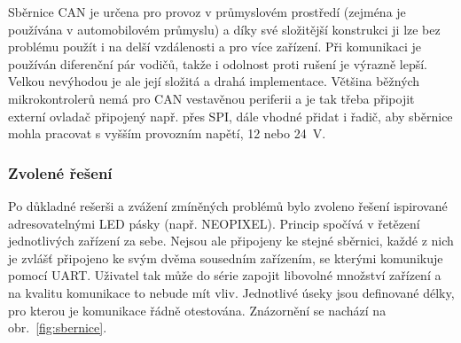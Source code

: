         Sběrnice CAN je určena pro provoz v průmyslovém prostředí (zejména je používána v automobilovém průmyslu) a díky své složitější konstrukci ji lze bez problému použít i na delší vzdálenosti a pro více zařízení. Při komunikaci je používán diferenční pár vodičů, takže i odolnost proti rušení je výrazně lepší. Velkou nevýhodou je ale její složitá a drahá implementace. Většina běžných mikrokontrolerů nemá pro CAN vestavěnou periferii a je tak třeba připojit externí ovladač připojený např. přes SPI, dále vhodné přidat i řadič, aby sběrnice mohla pracovat s vyšším provozním napětí, 12 nebo \qty{24}{V}. 

    \subsubsection{Zvolené řešení}
        Po důkladné rešerši a zvážení zmíněných problémů bylo zvoleno řešení ispirované adresovatelnými LED pásky (např. NEOPIXEL). Princip spočívá v řetězení jednotlivých zařízení za sebe. Nejsou ale připojeny ke stejné sběrnici, každé z nich je zvlášť připojeno ke svým dvěma sousedním zařízením, se kterými komunikuje pomocí UART. Uživatel tak může do série zapojit libovolné množství zařízení a na kvalitu komunikace to nebude mít vliv. Jednotlivé úseky jsou definované délky, pro kterou je komunikace řádně otestována. Znázornění se nachází na obr.~\ref{fig:sbernice}.

